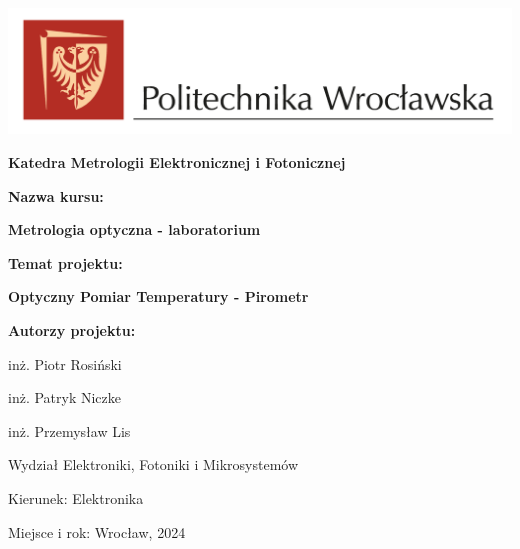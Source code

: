 \begin{titlepage}
    \centering
    \includegraphics[width=1\textwidth]{images/logo PWr kolor poziom}\par
    {\huge\bfseries Katedra Metrologii Elektronicznej i Fotonicznej\par}
    \vspace{1.5cm}
    {\Large\bfseries Nazwa kursu:\par}
    {\huge\bfseries Metrologia optyczna - laboratorium\par}
    \vspace{1.5cm}
    {\Large\bfseries Temat projektu:\par}
    {\huge\bfseries Optyczny Pomiar Temperatury - Pirometr\par}
    \vspace{1.5cm}
    {\Large\bfseries Autorzy projektu:\par}
    \vspace{0.25cm}
    {\large inż. Piotr Rosiński\par}
    {\large inż. Patryk Niczke\par}
    {\large inż. Przemysław Lis\par}
    \vspace{1.5cm}
    {\large Wydział Elektroniki, Fotoniki i Mikrosystemów\par}
    {\large Kierunek: Elektronika\par}
    \vspace{1cm}
    {\large Miejsce i rok: Wrocław, 2024\par}
    \vspace*{\fill}
    \end{titlepage}